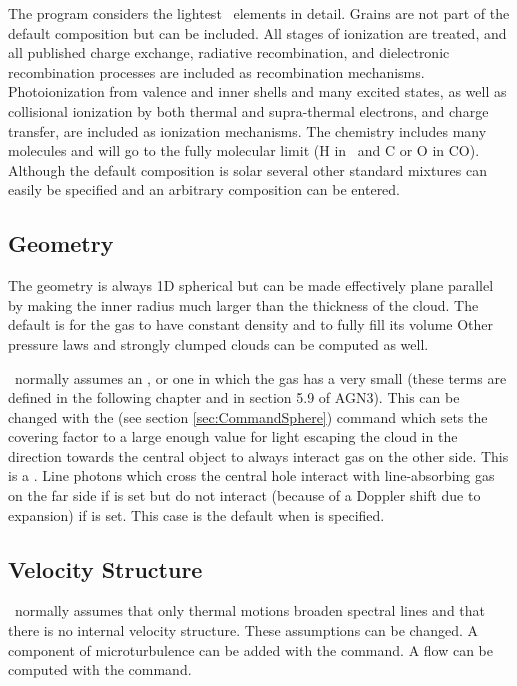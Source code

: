 \noindent The program considers the lightest \LIMELM\ elements in detail.
Grains are
not part of the default composition but can be included.
All stages of
ionization are treated, and all published charge exchange, radiative
recombination, and dielectronic recombination processes are included as
recombination mechanisms.
Photoionization from valence and inner shells
and many excited states, as well as collisional ionization by
both thermal and supra-thermal electrons, and charge transfer, are included as ionization mechanisms.
The chemistry includes many molecules and will go to the fully
molecular limit (H in \htwo\ and C or O in CO).
Although the default composition
is solar several other standard mixtures can easily be specified and an
arbitrary composition can be entered.

\subsection{Geometry}

\noindent The geometry is always 1D spherical but can be made effectively plane
parallel by making the inner radius much larger than the thickness of the
cloud.  The default is for the gas to have constant density and to fully
fill its volume
Other pressure laws and strongly clumped clouds can be computed as well.

\Cloudy\ normally assumes an ,
or one in which the gas has
a very small 
(these terms are defined in the following chapter
and in section 5.9 of AGN3).
This can be changed with
the  (see section \ref{sec:CommandSphere}) command which sets the covering factor
to a large enough value for light escaping
the cloud in the direction towards the central object to always interact
gas on the other side.
This is a .
Line photons which
cross the central hole interact with line-absorbing gas on the far side
if  is set but do not interact (because of a Doppler shift
due to expansion) if  is set.
This case is the default when  is specified.

\subsection{Velocity Structure}

\noindent \Cloudy\ normally assumes that only thermal motions broaden spectral lines and that there is no internal velocity structure.
These assumptions can be changed.
A component of microturbulence can be added with the
 command.
A flow can be computed with the  command.

